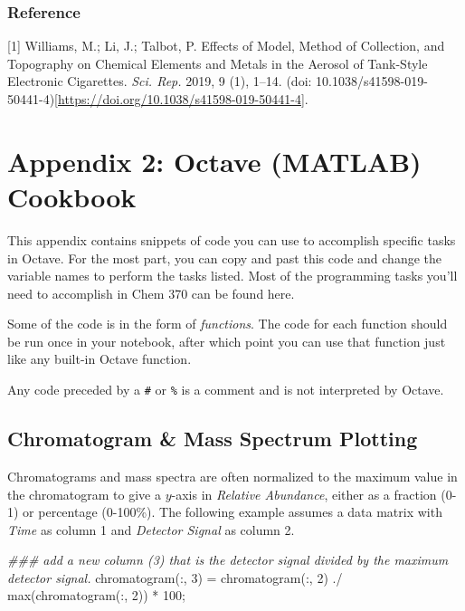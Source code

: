 \documentclass[]{tufte-book}
\newenvironment{Shaded}{}{}
\newcommand{\CommentTok}[1]{\textcolor[rgb]{0.38,0.63,0.69}{\textit{#1}}}
\newcommand{\FloatTok}[1]{\textcolor[rgb]{0.25,0.63,0.44}{#1}}
\newcommand{\FunctionTok}[1]{\textcolor[rgb]{0.02,0.16,0.49}{#1}}
\newcommand{\NormalTok}[1]{#1}
\newcommand{\OperatorTok}[1]{\textcolor[rgb]{0.40,0.40,0.40}{#1}}
\begin{document}
\hypertarget{reference-2}{%
\subsection{Reference}\label{reference-2}}

{[}1{]} Williams, M.; Li, J.; Talbot, P. Effects of Model, Method of Collection, and Topography on Chemical Elements and Metals in the Aerosol of Tank-Style Electronic Cigarettes. \emph{Sci. Rep.} 2019, 9 (1), 1--14. (doi: 10.1038/s41598-019-50441-4){[}\url{https://doi.org/10.1038/s41598-019-50441-4}{]}.

\hypertarget{appendix-2-octave-matlab-cookbook}{%
\chapter*{Appendix 2: Octave (MATLAB) Cookbook}\label{appendix-2-octave-matlab-cookbook}}

This appendix contains snippets of code you can use to accomplish specific tasks in Octave. For the most part, you can copy and past this code and change the variable names to perform the tasks listed. Most of the programming tasks you'll need to accomplish in Chem 370 can be found here.

Some of the code is in the form of \emph{functions}. The code for each function should be run once in your notebook, after which point you can use that function just like any built-in Octave function.

Any code preceded by a \texttt{\#} or \texttt{\%} is a comment and is not interpreted by Octave.

\hypertarget{chromatogram-mass-spectrum-plotting}{%
\section*{Chromatogram \& Mass Spectrum Plotting}\label{chromatogram-mass-spectrum-plotting}}

Chromatograms and mass spectra are often normalized to the maximum value in the chromatogram to give a \(y\)-axis in \emph{Relative Abundance}, either as a fraction (0-1) or percentage (0-100\%). The following example assumes a data matrix with \emph{Time} as column 1 and \emph{Detector Signal} as column 2.

\begin{Shaded}
\begin{Highlighting}[]
\CommentTok{### add a new column (3) that is the detector signal divided by the maximum detector signal.}
\NormalTok{chromatogram(}\OperatorTok{:,} \FloatTok{3}\NormalTok{) }\OperatorTok{=}\NormalTok{ chromatogram(}\OperatorTok{:,} \FloatTok{2}\NormalTok{) }\OperatorTok{./} \FunctionTok{max}\NormalTok{(chromatogram(}\OperatorTok{:,} \FloatTok{2}\NormalTok{)) }\OperatorTok{*} \FloatTok{100}\OperatorTok{;}
\end{Highlighting}
\end{Shaded}
\end{document}
